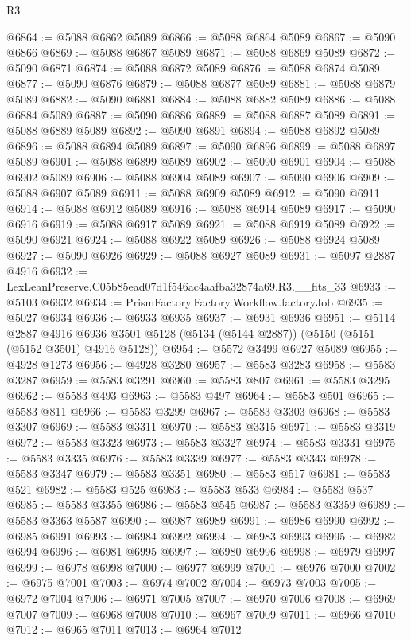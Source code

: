 \begin{lexlean}{R3}
\begin{coremodule}
@6864 := @5088 @6862 @5089
@6866 := @5088 @6864 @5089
@6867 := @5090 @6866
@6869 := @5088 @6867 @5089
@6871 := @5088 @6869 @5089
@6872 := @5090 @6871
@6874 := @5088 @6872 @5089
@6876 := @5088 @6874 @5089
@6877 := @5090 @6876
@6879 := @5088 @6877 @5089
@6881 := @5088 @6879 @5089
@6882 := @5090 @6881
@6884 := @5088 @6882 @5089
@6886 := @5088 @6884 @5089
@6887 := @5090 @6886
@6889 := @5088 @6887 @5089
@6891 := @5088 @6889 @5089
@6892 := @5090 @6891
@6894 := @5088 @6892 @5089
@6896 := @5088 @6894 @5089
@6897 := @5090 @6896
@6899 := @5088 @6897 @5089
@6901 := @5088 @6899 @5089
@6902 := @5090 @6901
@6904 := @5088 @6902 @5089
@6906 := @5088 @6904 @5089
@6907 := @5090 @6906
@6909 := @5088 @6907 @5089
@6911 := @5088 @6909 @5089
@6912 := @5090 @6911
@6914 := @5088 @6912 @5089
@6916 := @5088 @6914 @5089
@6917 := @5090 @6916
@6919 := @5088 @6917 @5089
@6921 := @5088 @6919 @5089
@6922 := @5090 @6921
@6924 := @5088 @6922 @5089
@6926 := @5088 @6924 @5089
@6927 := @5090 @6926
@6929 := @5088 @6927 @5089
@6931 := @5097 @2887 @4916
@6932 := LexLeanPreserve.C05b85ead07d1f546ac4aafba32874a69.R3.__fits_33
@6933 := @5103 @6932
@6934 := PrismFactory.Factory.Workflow.factoryJob
@6935 := @5027 @6934
@6936 := @6933 @6935
@6937 := @6931 @6936
@6951 := @5114
    @2887
    @4916
    @6936
    @3501
    @5128
    (@5134 (@5144 @2887))
    (@5150 (@5151 (@5152 @3501) @4916 @5128))
@6954 := @5572 @3499 @6927 @5089
@6955 := @4928 @1273
@6956 := @4928 @3280
@6957 := @5583 @3283
@6958 := @5583 @3287
@6959 := @5583 @3291
@6960 := @5583 @807
@6961 := @5583 @3295
@6962 := @5583 @493
@6963 := @5583 @497
@6964 := @5583 @501
@6965 := @5583 @811
@6966 := @5583 @3299
@6967 := @5583 @3303
@6968 := @5583 @3307
@6969 := @5583 @3311
@6970 := @5583 @3315
@6971 := @5583 @3319
@6972 := @5583 @3323
@6973 := @5583 @3327
@6974 := @5583 @3331
@6975 := @5583 @3335
@6976 := @5583 @3339
@6977 := @5583 @3343
@6978 := @5583 @3347
@6979 := @5583 @3351
@6980 := @5583 @517
@6981 := @5583 @521
@6982 := @5583 @525
@6983 := @5583 @533
@6984 := @5583 @537
@6985 := @5583 @3355
@6986 := @5583 @545
@6987 := @5583 @3359
@6989 := @5583 @3363 @5587
@6990 := @6987 @6989
@6991 := @6986 @6990
@6992 := @6985 @6991
@6993 := @6984 @6992
@6994 := @6983 @6993
@6995 := @6982 @6994
@6996 := @6981 @6995
@6997 := @6980 @6996
@6998 := @6979 @6997
@6999 := @6978 @6998
@7000 := @6977 @6999
@7001 := @6976 @7000
@7002 := @6975 @7001
@7003 := @6974 @7002
@7004 := @6973 @7003
@7005 := @6972 @7004
@7006 := @6971 @7005
@7007 := @6970 @7006
@7008 := @6969 @7007
@7009 := @6968 @7008
@7010 := @6967 @7009
@7011 := @6966 @7010
@7012 := @6965 @7011
@7013 := @6964 @7012

\end{coremodule}
\end{lexlean}
